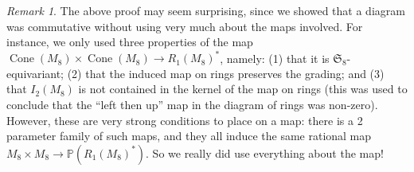 \documentclass{amsart}
\theoremstyle{definition}
\theoremstyle{remark}
\newtheorem{remark}[theorem]{\it Remark}
\DeclareMathOperator{\Cone}{Cone}
\def\SS{\mathfrak{S}}
\def\P{\mathbb{P}}
\begin{document}
\begin{remark}
The above proof may seem surprising, since we showed that a diagram was commutative without using very much
about the maps involved.  For instance, we only used three properties of the map $\Cone(M_8) \times \Cone(M_8) \to
R_1(M_8)^*$, namely:  (1) that it is $\SS_8$-equivariant; (2) that the induced map on rings preserves the grading; and (3)
that $I_2(M_8)$ is not contained in the kernel of the map on rings (this was used to conclude that the ``left then
up'' map in the diagram of rings was non-zero).  However, these are very strong conditions to place on a map:  there
is a 2 parameter family of such maps, and they all induce the same rational map $M_8 \times M_8 \to \P(R_1(M_8)^*)$.
So we really did use everything about the map!
\end{remark}
\end{document}
